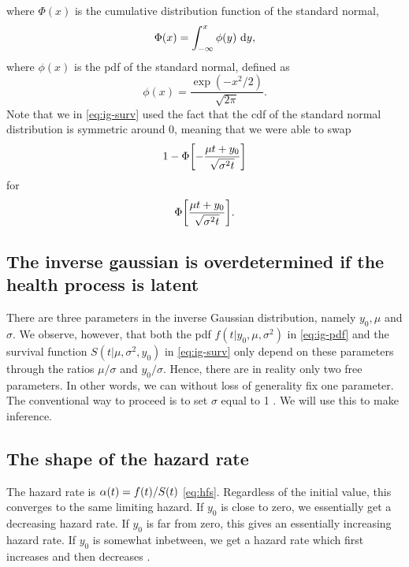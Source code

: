 where $\Phi(x)$ is the cumulative distribution function of the standard normal,
\begin{equation*}
    \Phi(x)=\int_{-\infty}^x\phi(y)\text{~d}y,
\end{equation*}
where $\phi(x)$ is the pdf of the standard normal, defined as
\begin{equation}
    \phi(x)=\frac{\exp\left(-x^2/2\right)}{\sqrt{2\pi}}.
\end{equation}
Note that we in \eqref{eq:ig-surv} used the fact that the cdf of the standard normal distribution is symmetric around 0,
meaning that we were able to swap
\begin{equation*}
    1-\Phi\sqb*{-\frac{\mu t+y_0}{\sqrt{\sigma^2t}}}
\end{equation*}
for
\begin{equation*}
    \Phi\sqb*{\frac{\mu t+y_0}{\sqrt{\sigma^2t}}}.
\end{equation*}

\subsection{The inverse gaussian is overdetermined if the health process is latent}
There are three parameters in the inverse Gaussian distribution, namely $y_0, \mu$ and $\sigma$.
We observe, however, that both the pdf $f(t|y_0,\mu,\sigma^2)$ in \eqref{eq:ig-pdf} and the survival function $S(t|\mu,\sigma^2,y_0)$ in \eqref{eq:ig-surv} only depend on these parameters through the ratios $\mu/\sigma$ and $y_0/\sigma$.
Hence, there are in reality only two free parameters. In other words, we can without loss of generality fix one parameter. The conventional way to proceed is to set $\sigma$ equal to 1 \citep{leewhitmore2006}. We will use this to make inference.

\subsection{The shape of the hazard rate}
The hazard rate is $\alpha(t)=f(t)/S(t)$ \eqref{eq:hfs}. Regardless of the initial value, this converges to the same limiting hazard. If $y_0$ is close to zero, we essentially get a decreasing hazard rate. If $y_0$ is far from zero, this gives an essentially increasing hazard rate. If $y_0$ is somewhat inbetween, we get a hazard rate which first increases and then decreases \citep{ABG}.

